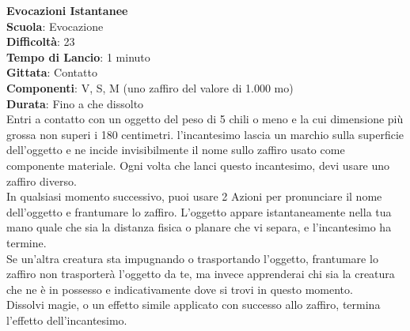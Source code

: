\begin{multicols}{2}
\medskip\textbf{Evocazioni Istantanee}\\
\textbf{Scuola}: Evocazione\\
\textbf{Difficoltà}:  23\\
\textbf{Tempo di Lancio}: 1 minuto\\
\textbf{Gittata}: Contatto\\
\textbf{Componenti}: V, S, M (uno zaffiro del valore di 1.000 mo)\\
\textbf{Durata}: Fino a che dissolto \\
Entri a contatto con un oggetto del peso di 5 chili o meno e la cui dimensione più grossa non superi i 180 centimetri. l'incantesimo lascia un marchio sulla superficie dell'oggetto e ne incide invisibilmente il nome sullo zaffiro usato come componente materiale. Ogni volta che lanci questo incantesimo, devi usare uno zaffiro diverso.\\
In qualsiasi momento successivo, puoi usare 2 Azioni per pronunciare il nome dell'oggetto e frantumare lo zaffiro. L’oggetto appare istantaneamente nella tua mano quale che sia la distanza fisica o planare che vi separa, e l'incantesimo ha termine.\\
Se un'altra creatura sta impugnando o trasportando l’oggetto, frantumare lo zaffiro non trasporterà l’oggetto da te, ma invece apprenderai chi sia la creatura che ne è in possesso e indicativamente dove si trovi in questo momento.\\
Dissolvi magie, o un effetto simile applicato con successo allo zaffiro, termina l’effetto dell'incantesimo. 


\end{multicols}

